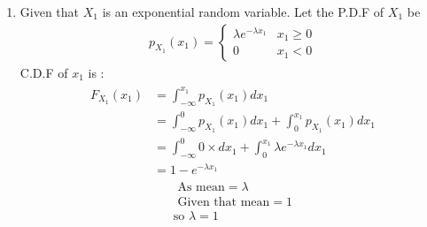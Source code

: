 \begin{enumerate}
    \item Given that $X_1$ is an exponential random variable. Let the P.D.F of $X_1$ be
    \begin{align}
    p_{X_1}(x_1)=
        \begin{cases}
        \lambda e^{-\lambda x_1} & x_1 \geq 0\\
        0 & x_1<0
        \end{cases}
    \end{align}
    C.D.F of $x_1$ is :
    \begin{align}
    \begin{split}
        F_{X_1}(x_1)&=\int_{-\infty}^{x_1} p_{X_1}(x_1) dx_1\\
        &=\int_{-\infty}^0 p_{X_1}(x_1) dx_1+\int_{0}^{x_1} p_{X_1}(x_1) dx_1\\
        &=\int_{-\infty}^0 0 \times dx_1+\int_{0}^ {x_1} \lambda e^{-\lambda x_1} dx_1\\
        &=1-e^{-\lambda x_1}\label{ec55:eq:0.0.2}
        \end{split}
    \end{align}
    \begin{align}
    \text{ As mean}=\lambda\\
     \text{ Given that mean}=1\\
     \text{so } \lambda=1 \label{ec55:eq:0.0.5}
    \end{align} 
     

\end{enumerate}
